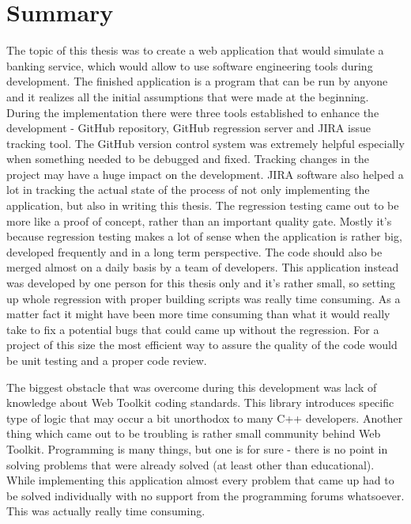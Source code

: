 \documentclass[a4paper,12pt]{book}
\newcommand\tab[1][1cm]{\hspace*{#1}}
\begin{document}
\chapter{Summary}
{
\tab The topic of this thesis was to create a web application that would simulate a banking service, which would allow to use software engineering tools during development. The finished application is a program that can be run by anyone and it realizes all the initial assumptions that were made at the beginning. During the implementation there were three tools established to enhance the development - GitHub repository, GitHub regression server and JIRA issue tracking tool. The GitHub version control system was extremely helpful especially when something needed to be debugged and fixed. Tracking changes in the project may have a huge impact on the development. JIRA software also helped a lot in tracking the actual state of the process of not only implementing the application, but also in writing this thesis. The regression testing came out to be more like a proof of concept, rather than an important quality gate. Mostly it's because regression testing makes a lot of sense when the application is rather big, developed frequently and in a long term perspective. The code should also be merged almost on a daily basis by a team of developers. This application instead was developed by one person for this thesis only and it's rather small, so setting up whole regression with proper building scripts was really time consuming. As a matter fact it might have been more time consuming than what it would really take to fix a potential bugs that could came up without the regression. For a project of this size the most efficient way to assure the quality of the code would be unit testing and a proper code review.

\bigskip
The biggest obstacle that was overcome during this development was lack of knowledge about Web Toolkit coding standards. This library introduces specific type of logic that may occur a bit unorthodox to many C++ developers. Another thing which came out to be troubling is rather small community behind Web Toolkit. Programming is many things, but one is for sure - there is no point in solving problems that were already solved (at least other than educational). While implementing this application almost every problem that came up had to be solved individually with no support from the programming forums whatsoever. This was actually really time consuming.

}
\end{document}
